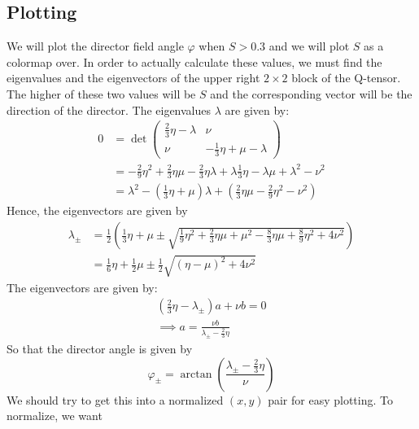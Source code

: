 \documentclass[reqno]{article}
\begin{document}
	\subsection{Plotting}
	We will plot the director field angle $\varphi$ when $S > 0.3$ and we will plot $S$ as a colormap over. In order to actually calculate these values, we must find the eigenvalues and the eigenvectors of the upper right $2\times 2$ block of the Q-tensor. The higher of these two values will be $S$ and the corresponding vector will be the direction of the director. The eigenvalues $\lambda$ are given by:
	\begin{equation}
	\begin{split}
		0 &= \det
		\begin{pmatrix}
		\tfrac23\eta - \lambda & \nu \\
		\nu & -\tfrac13\eta + \mu - \lambda
		\end{pmatrix} \\
		&= -\tfrac29\eta^2 + \tfrac23 \eta \mu -\tfrac23 \eta \lambda + \lambda \tfrac13 \eta - \lambda\mu + \lambda^2 - \nu^2 \\
		&= \lambda^2 - \left( \tfrac13 \eta + \mu\right) \lambda + \left( \tfrac23\eta\mu - \tfrac29\eta^2 - \nu^2\right)
	\end{split}
	\end{equation}
	Hence, the eigenvectors are given by
	\begin{equation}
	\begin{split}
		\lambda_\pm &= \tfrac12\left(\tfrac13\eta + \mu \pm \sqrt{\tfrac19\eta^2 + \tfrac23\eta\mu + \mu^2 - \tfrac83\eta\mu + \tfrac89\eta^2 + 4\nu^2}\right) \\
		&= \tfrac16\eta + \tfrac12\mu \pm \tfrac12\sqrt{\left( \eta - \mu \right)^2 + 4\nu^2}
	\end{split}
	\end{equation}
	The eigenvectors are given by:
	\begin{equation}
	\begin{split}
		\left(\tfrac23 \eta - \lambda_\pm\right)a + \nu b = 0 \\
		\implies a = \frac{\nu b}{\lambda_\pm - \tfrac23\eta}
	\end{split}
	\end{equation}
	So that the director angle is given by
	\begin{equation}
		\varphi_\pm = \arctan\left( \frac{\lambda_\pm -\tfrac23 \eta}{\nu} \right)
	\end{equation}
	We should try to get this into a normalized $(x, y)$ pair for easy plotting. To normalize, we want
\end{document}
